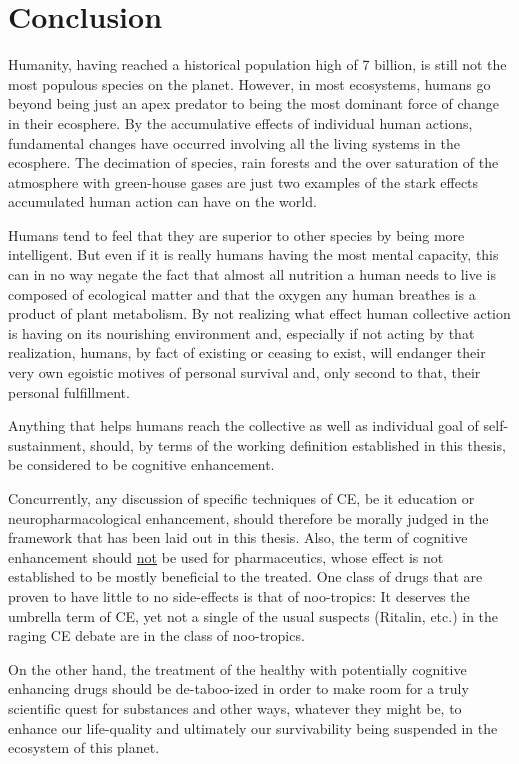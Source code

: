 \chapter{Conclusion}
Humanity, having reached a historical population high of 7 billion, is still not the most populous species on the planet. However, in most ecosystems, humans go beyond being just an apex predator to being the most dominant force of change in their ecosphere. By the accumulative effects of individual human actions, fundamental changes have occurred involving all the living systems in the ecosphere. The decimation of species, rain forests and the over saturation of the atmosphere with green-house gases are just two examples of the stark effects accumulated human action can have on the world.

Humans tend to feel that they are superior to other species by being more intelligent. But even if it is really humans having the most mental capacity, this can in no way negate the fact that almost all nutrition a human needs to live is composed of ecological matter and that the oxygen any human breathes is a product of plant metabolism. By not realizing what effect human collective action is having on its nourishing environment and, especially if not acting by that realization, humans, by fact of existing or ceasing to exist, will endanger their very own egoistic motives of personal survival and, only second to that, their personal fulfillment.

Anything that helps humans reach the collective as well as individual goal of self-sustainment, should, by terms of the working definition established in this thesis, be considered to be cognitive enhancement.

Concurrently, any discussion of specific techniques of CE, be it education or neuropharmacological enhancement, should therefore be morally judged in the framework that has been laid out in this thesis. Also, the term of cognitive enhancement should \underline{not} be used for pharmaceutics, whose effect is not established to be mostly beneficial to the treated. One class of drugs that are proven to have little to no side-effects is that of noo-tropics: It deserves the umbrella term of CE, yet not a single of the usual suspects (Ritalin, etc.) in the raging CE debate are in the class of noo-tropics.

On the other hand, the treatment of the healthy with potentially cognitive enhancing drugs should be de-taboo-ized in order to make room for a truly scientific quest for substances and other ways, whatever they might be, to enhance our life-quality and ultimately our survivability being suspended in the ecosystem of this planet.

